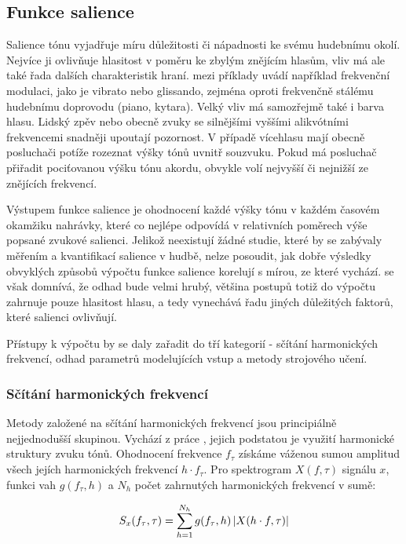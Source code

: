 \subsection{Funkce salience}

Salience tónu vyjadřuje míru důležitosti či nápadnosti ke svému hudebnímu okolí. Nejvíce ji ovlivňuje hlasitost v poměru ke zbylým znějícím hlasům, vliv má ale také řada dalších charakteristik hraní. \cite{Dressler2016} mezi příklady uvádí například frekvenční modulaci, jako je vibrato nebo glissando, zejména oproti frekvenčně stálému hudebnímu doprovodu (piano, kytara). Velký vliv má samozřejmě také i barva hlasu. Lidský zpěv nebo obecně zvuky se silnějšími vyššími alikvótními frekvencemi snadněji upoutají pozornost. V případě vícehlasu mají obecně posluchači potíže rozeznat výšky tónů uvnitř souzvuku. Pokud má posluchač přiřadit pociťovanou výšku tónu akordu, obvykle volí nejvyšší či nejnižší ze znějících frekvencí.

Výstupem funkce salience je ohodnocení každé výšky tónu v každém časovém okamžiku nahrávky, které co nejlépe odpovídá v relativních poměrech výše popsané zvukové salienci. Jelikož neexistují žádné studie, které by se zabývaly měřením a kvantifikací salience v hudbě, nelze posoudit, jak dobře výsledky obvyklých způsobů výpočtu funkce salience korelují s mírou, ze které vychází. \cite{Bittner2018a} se však domnívá, že odhad bude velmi hrubý, většina postupů totiž do výpočtu zahrnuje pouze hlasitost hlasu, a tedy vynechává řadu jiných důležitých faktorů, které salienci ovlivňují.

Přístupy k výpočtu by se daly zařadit do tří kategorií - sčítání harmonických frekvencí, odhad parametrů modelujících vstup a metody strojového učení. 

\subsubsection{Sčítání harmonických frekvencí}

Metody založené na sčítání harmonických frekvencí jsou principiálně nejjednodušší skupinou. Vychází z práce \cite{Hermes1988}, jejich podstatou je využití harmonické struktury zvuku tónů. Ohodnocení frekvence $f_\tau$ získáme váženou sumou amplitud všech jejích harmonických frekvencí $h \cdot f_\tau$. Pro spektrogram $X(f, \tau)$ signálu $x$, funkci vah $g(f_\tau, h)$ a $N_h$ počet zahrnutých harmonických frekvencí v sumě:

    $$S_x(f_\tau, \tau) = \sum_{h=1}^{N_h}{g(f_\tau, h)\left|{X(h \cdot f, \tau)}\right|}$$

